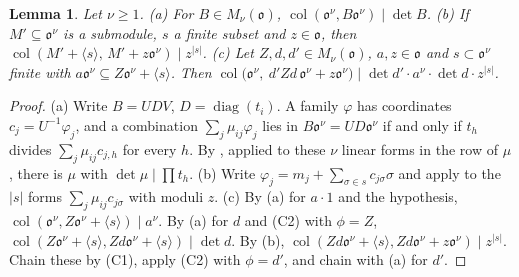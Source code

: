 \documentclass[10pt]{amsart}
\newtheorem{lemma}[theorem]{Lemma}
\theoremstyle{definition}
\theoremstyle{remark}
\providecommand{\aucol}{\operatorname{col}}
\providecommand{\pao}{\mathfrak o}
\begin{document}
\begin{lemma}\label{ph:col}
Let $\nu\ge1$. {\rm(a)} For $B\in M_\nu(\pao)$, $\aucol(\pao^\nu,B\pao^\nu)\mid\det B$.
{\rm(b)} If $M'\subseteq\pao^\nu$ is a submodule, $s$ a finite subset and $z\in\pao$, then
$\aucol(M'+\langle s\rangle,\,M'+z\pao^\nu)\mid z^{|s|}$.
{\rm(c)} Let $Z,d,d'\in M_\nu(\pao)$, $a,z\in\pao$ and $s\subset\pao^\nu$ finite with
$a\pao^\nu\subseteq Z\pao^\nu+\langle s\rangle$. Then
$\aucol\bigl(\pao^\nu,\ d'Zd\,\pao^\nu+z\pao^\nu\bigr)\mid\det d'\cdot a^\nu\cdot\det d\cdot
z^{|s|}$.
\end{lemma}
\begin{proof}
(a) Write $B=UDV$, $D=\operatorname{diag}(t_i)$. A family $\varphi$ has coordinates
$c_j=U^{-1}\varphi_j$, and a combination $\sum_j\mu_{ij}\varphi_j$ lies in $B\pao^\nu=UD\pao^\nu$ if
and only if $t_h$ divides $\sum_j\mu_{ij}c_{j,h}$ for every $h$. By {\cite[Lemma~4.2]{P49}}, applied to
these $\nu$ linear forms in the row of $\mu$, there is $\mu$ with $\det\mu\mid\prod t_h$. (b) Write
$\varphi_j=m_j+\sum_{\sigma\in s}c_{j\sigma}\sigma$ and apply {\cite[Lemma~4.2]{P49}} to the $|s|$
forms $\sum_j\mu_{ij}c_{j\sigma}$ with moduli $z$. (c) By (a) for $a\cdot1$ and the hypothesis,
$\aucol(\pao^\nu,Z\pao^\nu+\langle s\rangle)\mid a^\nu$. By (a) for $d$ and (C2) with $\phi=Z$,
$\aucol(Z\pao^\nu+\langle s\rangle,Zd\pao^\nu+\langle s\rangle)\mid\det d$. By (b),
$\aucol(Zd\pao^\nu+\langle s\rangle,Zd\pao^\nu+z\pao^\nu)\mid z^{|s|}$. Chain these by (C1), apply
(C2) with $\phi=d'$, and chain with (a) for $d'$.
\end{proof}
\end{document}
